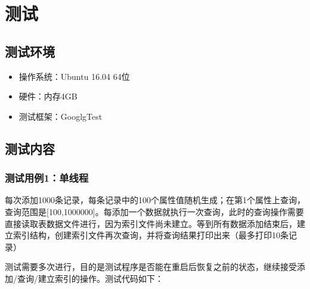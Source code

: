 \documentclass[bachelor]{thesis-uestc}
\begin{document}
\chapter{测试}
\section{测试环境}
\begin{itemize}
	\item 操作系统：Ubuntu 16.04 64位
	\item 硬件：内存4GB
	\item 测试框架：GooglgTest
\end{itemize}

\section{测试内容}
\subsection{测试用例1：单线程}
每次添加1000条记录，每条记录中的100个属性值随机生成；在第1个属性上查询，查询范围是[100,1000000]。每添加一个数据就执行一次查询，此时的查询操作需要直接读取表数据文件进行，因为索引文件尚未建立。等到所有数据添加结束后，建立索引结构，创建索引文件再次查询，并将查询结果打印出来（最多打印10条记录）\par
测试需要多次进行，目的是测试程序是否能在重启后恢复之前的状态，继续接受添加/查询/建立索引的操作。测试代码如下：
\end{document}
